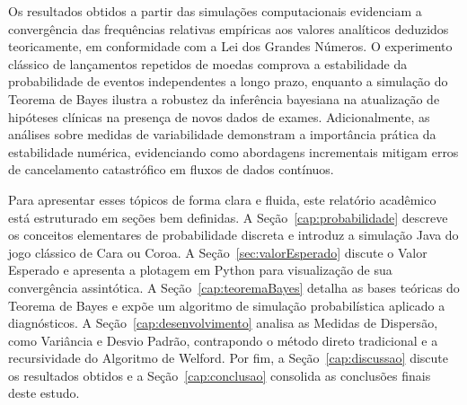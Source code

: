 Os resultados obtidos a partir das simulações computacionais evidenciam a convergência das frequências relativas empíricas aos valores analíticos deduzidos teoricamente, em conformidade com a Lei dos Grandes Números. O experimento clássico de lançamentos repetidos de moedas comprova a estabilidade da probabilidade de eventos independentes a longo prazo, enquanto a simulação do Teorema de Bayes ilustra a robustez da inferência bayesiana na atualização de hipóteses clínicas na presença de novos dados de exames. Adicionalmente, as análises sobre medidas de variabilidade demonstram a importância prática da estabilidade numérica, evidenciando como abordagens incrementais mitigam erros de cancelamento catastrófico em fluxos de dados contínuos.

Para apresentar esses tópicos de forma clara e fluida, este relatório acadêmico está estruturado em seções bem definidas. A Seção~\ref{cap:probabilidade} descreve os conceitos elementares de probabilidade discreta e introduz a simulação Java do jogo clássico de Cara ou Coroa. A Seção~\ref{sec:valorEsperado} discute o Valor Esperado e apresenta a plotagem em Python para visualização de sua convergência assintótica. A Seção~\ref{cap:teoremaBayes} detalha as bases teóricas do Teorema de Bayes e expõe um algoritmo de simulação probabilística aplicado a diagnósticos. A Seção~\ref{cap:desenvolvimento} analisa as Medidas de Dispersão, como Variância e Desvio Padrão, contrapondo o método direto tradicional e a recursividade do Algoritmo de Welford. Por fim, a Seção~\ref{cap:discussao} discute os resultados obtidos e a Seção~\ref{cap:conclusao} consolida as conclusões finais deste estudo.

